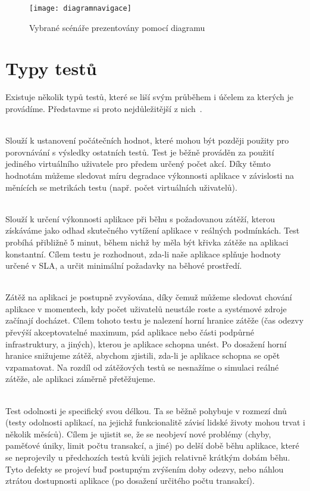 \documentclass[122pt,oneside]{fithesis}
\begin{document}
\begin{figure}[!ht]
\centering
\texttt{[image: diagramnavigace]}
\caption{Vybrané scénáře prezentovány pomocí diagramu}
\label{img:diagramNavigace}
\end{figure}

\section{Typy testů}
Existuje několik typů testů, které se liší svým průběhem i účelem za kterých je provádíme. Představme si proto nejdůležitější z nich~\cite{loadTest}.

\vspace{5 mm}
\\\indent Slouží k ustanovení počátečních hodnot, které mohou být později použity pro porovnávání s výsledky ostatních testů. Test je běžně prováděn za použití jediného virtuálního uživatele pro předem určený počet akcí. Díky těmto hodnotám můžeme sledovat míru degradace výkonnosti aplikace v závislosti na měnících se metrikách testu (např. počet virtuálních uživatelů).

\vspace{5 mm}
\\\indent Slouží k určení výkonnosti aplikace při běhu s požadovanou zátěží, kterou získáváme jako odhad skutečného vytížení aplikace v reálných podmínkách. Test probíhá přibližně 5 minut, během nichž by měla být křivka zátěže na aplikaci konstantní. Cílem testu je rozhodnout, zda-li naše aplikace splňuje hodnoty určené v SLA, a určit minimální požadavky na běhové prostředí.

\vspace{5 mm}
\\\indent Zátěž na aplikaci je postupně zvyšována, díky čemuž můžeme sledovat chování aplikace v momentech, kdy počet uživatelů neustále roste a systémové zdroje začínají docházet. Cílem tohoto testu je nalezení horní hranice zátěže (čas odezvy převýší akceptovatelné maximum, pád aplikace nebo části podpůrné infrastruktury, a jiných), kterou je aplikace schopna unést. Po dosažení horní hranice snižujeme zátěž, abychom zjistili, zda-li je aplikace schopna se opět vzpamatovat. Na rozdíl od zátěžových testů se nesnažíme o simulaci reálné zátěže, ale aplikaci záměrně přetěžujeme.

\vspace{5 mm}
\\\indent Test odolnosti je specifický svou délkou. Ta se běžně pohybuje v rozmezí dnů (testy odolnosti aplikací, na jejichž funkcionalitě závisí lidské životy mohou trvat i několik měsíců). Cílem je ujistit se, že se neobjeví nové problémy (chyby, paměťové úniky, limit počtu transakcí, a jiné) po delší době běhu aplikace, které se neprojevily u předchozích testů kvůli jejich relativně krátkým dobám běhu. Tyto defekty se projeví buď postupným zvýšením doby odezvy, nebo náhlou ztrátou dostupnosti aplikace (po dosažení určitého počtu transakcí).
\end{document}
